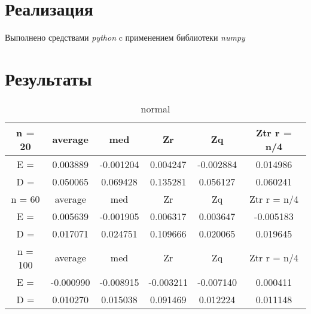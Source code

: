 \documentclass[12pt]{article}
\begin{document}
\section{Реализация}
Выполнено средствами \textit{python} c применением библиотеки \textit{numpy}\cite{numpy}

\section{Результаты}

\begin{table}[H]
\caption{normal}
\label{tab:my_label1}
\begin{center}
\vspace{5mm}
\begin{tabular}{|c|c|c|c|c|c|}
\hline
n = 20    &average     &med         &Zr          &Zq          &Ztr r = n/4 \\
\hline
E =       &0.003889    &-0.001204   &0.004247    &-0.002884   &0.014986    \\
\hline
D =       &0.050065    &0.069428    &0.135281    &0.056127    &0.060241    \\
\hline
n = 60    &average     &med         &Zr          &Zq          &Ztr r = n/4 \\
\hline
E =       &0.005639    &-0.001905   &0.006317    &0.003647    &-0.005183   \\
\hline
D =       &0.017071    &0.024751    &0.109666    &0.020065    &0.019645    \\
\hline
n = 100   &average     &med         &Zr          &Zq          &Ztr r = n/4 \\
\hline
E =       &-0.000990   &-0.008915   &-0.003211   &-0.007140   &0.000411    \\
\hline
D =       &0.010270    &0.015038    &0.091469    &0.012224    &0.011148    \\
\hline
\end{tabular}
\end{center}
\end{table}
\end{document}
